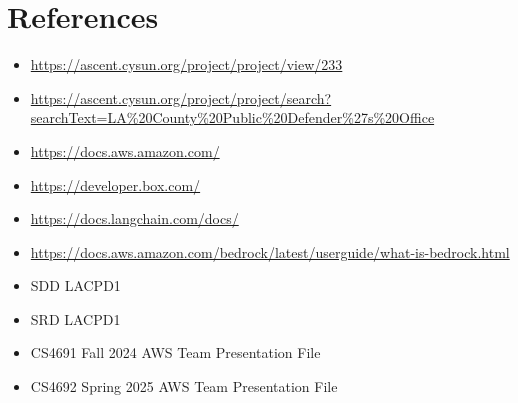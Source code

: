 \documentclass[11pt]{article}
\begin{document}
\section{References}
\begin{itemize}
\item \url{https://ascent.cysun.org/project/project/view/233}
\item \url{https://ascent.cysun.org/project/project/search?searchText=LA%20County%20Public%20Defender%27s%20Office}
\item \url{https://docs.aws.amazon.com/}
\item \url{https://developer.box.com/}
\item \url{https://docs.langchain.com/docs/}
\item \url{https://docs.aws.amazon.com/bedrock/latest/userguide/what-is-bedrock.html}
\item SDD LACPD1
\item SRD LACPD1
\item CS4691 Fall 2024 AWS Team Presentation File
\item CS4692 Spring 2025 AWS Team Presentation File
\end{itemize}
\end{document}
